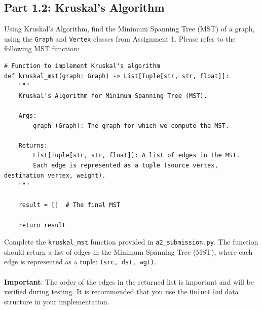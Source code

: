 \documentclass[12pt]{report}
\begin{document}
\subsection*{Part 1.2: Kruskal's Algorithm}
Using Kruskal's Algorithm, find the Minimum Spanning Tree (MST) of a graph, using the \texttt{Graph} and \texttt{Vertex} classes from Assignment 1. Please refer to the following MST function:
\begin{lstlisting}
# Function to implement Kruskal's algorithm
def kruskal_mst(graph: Graph) -> List[Tuple[str, str, float]]:
    """
    Kruskal's Algorithm for Minimum Spanning Tree (MST).

    Args:
        graph (Graph): The graph for which we compute the MST.

    Returns:
        List[Tuple[str, str, float]]: A list of edges in the MST. 
        Each edge is represented as a tuple (source vertex, destination vertex, weight).
    """
    
    result = []  # The final MST
    
    return result  
\end{lstlisting}
Complete the \texttt{kruskal\_mst} function provided in \texttt{a2\_submission.py}. 
The function should return a list of edges in the Minimum Spanning Tree (MST), where each edge is represented as a tuple: \texttt{(src, dst, wgt)}.
\\~\\
\textbf{Important}: The order of the edges in the returned list is important and will be verified during testing.
It is recommended that you use the \texttt{UnionFind} data structure in your implementation.

\clearpage
\end{document}
